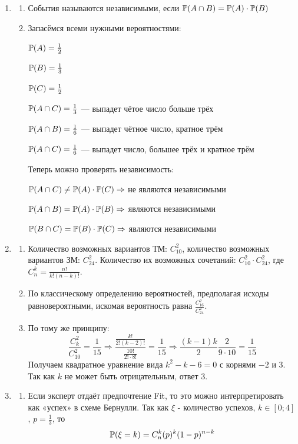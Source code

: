 \begin{enumerate}
\item
\begin{enumerate}
\item События называются независимыми, если  $ \P(A \cap B) = \P(A) \cdot \P(B)$
\item Запасёмся всеми нужными вероятностями:

$\P(A) = \frac{1}{2}$

$\P(B) = \frac{1}{3}$

$\P(C) = \frac{1}{2}$

$\P(A \cap C) = \frac{1}{3} $ — выпадет чётое число больше трёх

$\P(A \cap B)  = \frac{1}{6}$ — выпадет чётное число, кратное трём

$\P(A \cap C) = \frac{1}{6}$ — выпадет число, большее трёх и кратное трём

Теперь можно проверять независимость:

$\P(A \cap C) \neq \P(A) \cdot \P(C) \Rightarrow$  не являются независимыми

$ \P(A \cap B) = \P(A) \cdot \P(B) \Rightarrow$ являются независимыми

$ \P(B \cap C) = \P(B) \cdot \P(C) \Rightarrow$ являются независимыми

\end{enumerate}
\item
\begin{enumerate}
\item Количество возможных вариантов ТМ: $ C_{10}^2 $,  количество возможных
вариантов ЗМ: $ C_{24}^2 $. Количество их возможных сочетаний: $ C_{10}^2 \cdot C_{24}^2$,
где $ C_n^k = \frac{n!}{k!(n-k)!}$.
\item По классическому определению вероятностей, предполагая исходы равновероятными,
искомая вероятность равна $\frac{C_{16}^2}{C_{24}^2}$.
\item По тому же принципу:
\[
\frac{C_k^2}{C_{10}^2} = \frac{1}{15} \Rightarrow \frac{\frac{k!}{2!(k-2)!}}{\frac{10!}{2! \cdot 8!}} = \frac{1}{15} \Rightarrow \frac{(k-1)k}{2}\frac{ 2}{9 \cdot 10} = \frac{1}{15}
\]
Получаем квадратное уравнение вида $ k^2 - k - 6 = 0 $ с корнями $-2$ и $3$.
Так как $k$ не может быть отрицательным, ответ $3$.
\end{enumerate}
\item
\begin{enumerate}
\item Если эксперт отдаёт предпочтение Fit, то это можно интерпретировать как
«успех» в схеме Бернулли. Так как $\xi$ - количество успехов,
$ k \in [0;4]$, $p = \frac{1}{3} $, то
\[
\P(\xi = k) = C_n^k(p)^k(1-p)^{n-k}
\]


\end{enumerate}
\end{enumerate}
